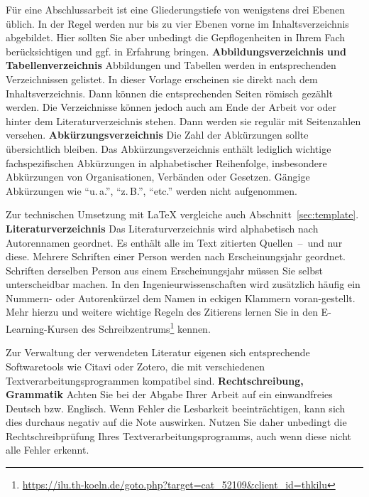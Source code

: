 Für eine Abschlussarbeit ist eine Gliederungstiefe von wenigstens drei Ebenen üblich. In der Regel werden nur bis zu vier Ebenen vorne im Inhaltsverzeichnis abgebildet. Hier sollten Sie aber unbedingt die Gepflogenheiten in Ihrem Fach berücksichtigen und ggf. in Erfahrung bringen.
%
%
\textbf{Abbildungsverzeichnis und Tabellenverzeichnis}
Abbildungen und Tabellen werden in entsprechenden Verzeichnissen gelistet. In dieser Vorlage erscheinen sie direkt nach dem Inhaltsverzeichnis. Dann können die entsprechenden Seiten römisch gezählt werden. Die Verzeichnisse können jedoch auch am Ende der Arbeit vor oder hinter dem Literaturverzeichnis stehen. Dann werden sie regulär mit Seitenzahlen versehen.
%
%
\textbf{Abkürzungsverzeichnis}
Die Zahl der Abkürzungen sollte übersichtlich bleiben. Das Abkürzungsverzeichnis enthält lediglich wichtige fachspezifischen Abkürzungen in alphabetischer Reihenfolge, insbesondere Abkürzungen von Organisationen, Verbänden oder Gesetzen. Gängige Abkürzungen wie \enquote{u.\,a.}, \enquote{z.\,B.}, \enquote{etc.} werden nicht aufgenommen.
\par
Zur technischen Umsetzung mit \LaTeX{} vergleiche auch Abschnitt~\ref{sec:template}.
%
%
\textbf{Literaturverzeichnis}
Das Literaturverzeichnis wird alphabetisch nach Autorennamen geordnet. Es enthält alle im Text zitierten Quellen~--~und nur diese. Mehrere Schriften einer Person werden nach Erscheinungsjahr geordnet. Schriften derselben Person aus einem Erscheinungsjahr müssen Sie selbst unterscheidbar machen. In den Ingenieurwissenschaften wird zusätzlich häufig ein Nummern- oder Autorenkürzel dem Namen in eckigen Klammern voran-gestellt. Mehr hierzu und weitere wichtige Regeln des Zitierens lernen Sie in den E-Learning-Kursen des Schreibzentrums\footnote{\href{https://ilu.th-koeln.de/goto.php?target=cat\_52109\&client\_id=thkilu}{https://ilu.th-koeln.de/goto.php?target=cat\_52109\&client\_id=thkilu}} kennen.
\par
Zur Verwaltung der verwendeten Literatur eigenen sich entsprechende Softwaretools wie Citavi oder Zotero, die mit verschiedenen Textverarbeitungsprogrammen kompatibel sind.
%
%
\textbf{Rechtschreibung, Grammatik}
Achten Sie bei der Abgabe Ihrer Arbeit auf ein einwandfreies Deutsch bzw. Englisch. Wenn Fehler die Lesbarkeit beeinträchtigen, kann sich dies durchaus negativ auf die Note auswirken. Nutzen Sie daher unbedingt die Rechtschreibprüfung Ihres Textverarbeitungsprogramms, auch wenn diese nicht alle Fehler erkennt.
